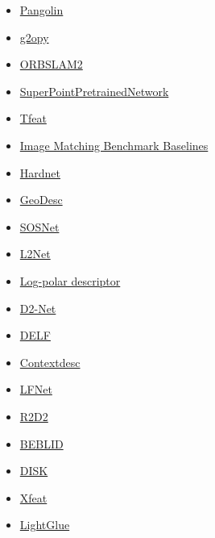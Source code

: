 \documentclass{article}
\providecommand{\tightlist}{%
  \setlength{\itemsep}{0pt}\setlength{\parskip}{0pt}}
\begin{document}
\begin{itemize}
\tightlist
\item
  \href{https://github.com/stevenlovegrove/Pangolin}{Pangolin}
\item
  \href{https://github.com/uoip/g2opy}{g2opy}
\item
  \href{https://github.com/raulmur/ORB_SLAM2}{ORBSLAM2} \cite{ORB_SLAM2}
\item
  \href{https://github.com/MagicLeapResearch/SuperPointPretrainedNetwork}{SuperPointPretrainedNetwork} \cite{detone18superpoint}
\item
  \href{https://github.com/vbalnt/tfeat}{Tfeat} \cite{Tfeat}
\item
  \href{https://github.com/vcg-uvic/image-matching-benchmark-baselines}{Image Matching Benchmark Baselines} \cite{ImageMatchingBenchmarkBaselines}
\item
  \href{https://github.com/DagnyT/hardnet.git}{Hardnet} \cite{Hardnet}
\item
  \href{https://github.com/lzx551402/geodesc.git}{GeoDesc} \cite{GeoDesc}
\item
  \href{https://github.com/yuruntian/SOSNet.git}{SOSNet} \cite{SOSNet}
\item
  \href{https://github.com/yuruntian/L2-Net}{L2Net} \cite{L2Net}
\item
  \href{https://github.com/cvlab-epfl/log-polar-descriptors}{Log-polar descriptor} \cite{LogPolarDescriptor}
\item
  \href{https://github.com/mihaidusmanu/d2-net}{D2-Net} \cite{D2Net}
\item
  \href{https://github.com/tensorflow/models/blob/master/research/delf/INSTALL_INSTRUCTIONS.md}{DELF} \cite{DELF}
\item
  \href{https://github.com/lzx551402/contextdesc}{Contextdesc} \cite{Contextdesc}
\item
  \href{https://github.com/vcg-uvic/lf-net-release}{LFNet} \cite{LFNet}
\item
  \href{https://github.com/naver/r2d2}{R2D2} \cite{R2D2}
\item
  \href{https://raw.githubusercontent.com/iago-suarez/BEBLID/master/BEBLID_Boosted_Efficient_Binary_Local_Image_Descriptor.pdf}{BEBLID} \cite{BEBLID}
\item
  \href{https://arxiv.org/abs/2006.13566}{DISK} \cite{DISK}
\item
  \href{https://arxiv.org/abs/2404.19174}{Xfeat} \cite{Xfeat}
\item
  \href{https://arxiv.org/abs/2306.13643}{LightGlue} \cite{LightGlue}

\end{itemize}
\end{document}
